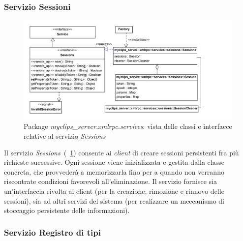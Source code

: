\subsubsection{Servizio Sessioni}

\begin{figure}
\centering
\includegraphics[width=1.2\textwidth]{Immagini/Capitolo3/Classi/myclips_server_services_Sessions.png}
\caption{Package \emph{myclips\_server.xmlrpc.services}: vista delle classi e interfacce relative al servizio \emph{Sessions}}\label{fig:class-myclips-server-services-sessions}
\end{figure}

Il servizio \emph{Sessions}~(\figurename~\ref{fig:class-myclips-server-services-sessions}) consente ai \emph{client} di creare sessioni persistenti fra più richieste successive. Ogni sessione viene inizializzata e gestita dalla classe concreta, che provvederà a memorizzarla fino per a quando non verranno riscontrate condizioni favorevoli all'eliminazione.
Il servizio fornisce sia un'interfaccia rivolta ai client (per la creazione, rimozione e rinnovo delle sessioni), sia ad altri servizi del sistema (per realizzare un meccanismo di stoccaggio persistente delle informazioni).


\subsubsection{Servizio Registro di tipi}

